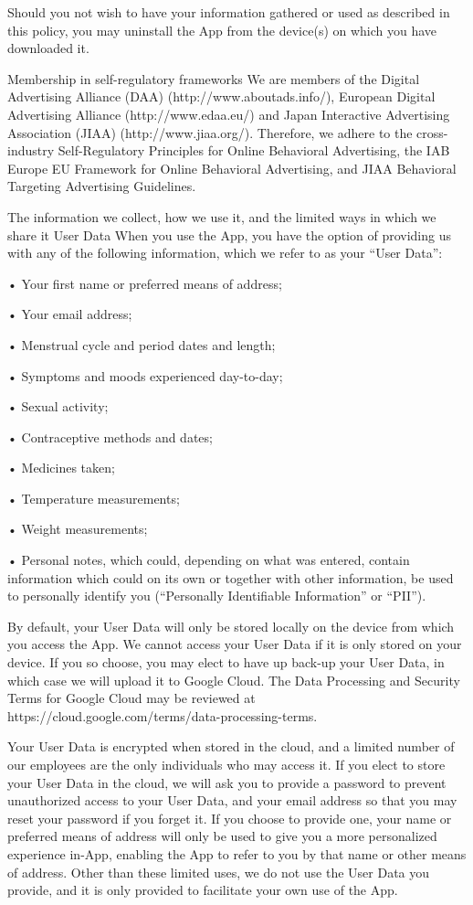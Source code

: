 Should you not wish to have your information gathered or used as described in this policy, you may uninstall the App from the device(s) on which you have downloaded it.

Membership in self-regulatory frameworks 
We are members of the Digital Advertising Alliance (DAA) (http://www.aboutads.info/), European Digital Advertising Alliance (http://www.edaa.eu/) and Japan Interactive Advertising Association (JIAA) (http://www.jiaa.org/). Therefore, we adhere to the cross-industry Self-Regulatory Principles for Online Behavioral Advertising, the IAB Europe EU Framework for Online Behavioral Advertising, and JIAA Behavioral Targeting Advertising Guidelines. 

The information we collect, how we use it, and the limited ways in which we share it 
User Data
When you use the App, you have the option of providing us with any of the following information, which we refer to as your “User Data”:

  •  Your first name or preferred means of address;

  •  Your email address;

  •  Menstrual cycle and period dates and length;

  •  Symptoms and moods experienced day-to-day;

  •  Sexual activity;

  •  Contraceptive methods and dates;

  •  Medicines taken;

  •  Temperature measurements;

  •  Weight measurements;

  •  Personal notes, which could, depending on what was entered, contain information which could on its own or together with other information, be used to personally identify you (“Personally Identifiable Information” or “PII”).

By default, your User Data will only be stored locally on the device from which you access the App. We cannot access your User Data if it is only stored on your device. If you so choose, you may elect to have up back-up your User Data, in which case we will upload it to Google Cloud. The Data Processing and Security Terms for Google Cloud may be reviewed at https://cloud.google.com/terms/data-processing-terms.

Your User Data is encrypted when stored in the cloud, and a limited number of our employees are the only individuals who may access it. If you elect to store your User Data in the cloud, we will ask you to provide a password to prevent unauthorized access to your User Data, and your email address so that you may reset your password if you forget it. If you choose to provide one, your name or preferred means of address will only be used to give you a more personalized experience in-App, enabling the App to refer to you by that name or other means of address. Other than these limited uses, we do not use the User Data you provide, and it is only provided to facilitate your own use of the App.

